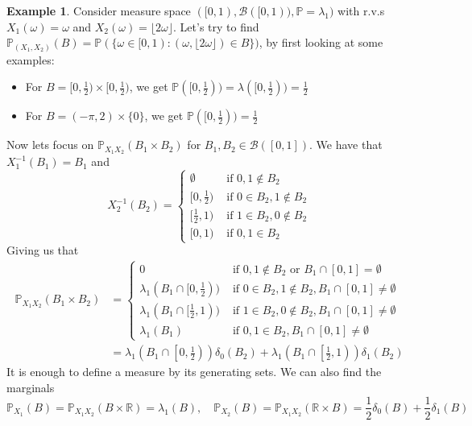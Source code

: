 \documentclass[11pt,a4paper]{article}
\theoremstyle{definition}
\newtheorem{example}{Example}[section]
\begin{document}
\begin{example}
    Consider measure space $([0,1), \mathcal{B}([0,1)), \mathbb{P} = \lambda_1)$ with r.v.s $X_1 (\omega ) = \omega$ and $X_2 (\omega) = \lfloor 2\omega \rfloor$. Let's try to find $\mathbb{P}_{(X_1, X_2)} (B) = \mathbb{P}(\{\omega \in [0,1):(\omega , \lfloor 2\omega \rfloor) \in B\})$, by first looking at some examples:
    \begin{itemize}
        \item For $B = [0,\frac{1}{2} ) \times [0,\frac{1}{2} )$, we get $\mathbb{P}([0,\frac{1}{2})) = \lambda ([0, \frac{1}{2})) = \frac{1}{2}$
        \item For $B = (-\pi , 2) \times \{0\}$, we get $\mathbb{P} ([0, \frac{1}{2})) = \frac{1}{2}$
    \end{itemize}
    Now lets focus on $\mathbb{P}_{X_1X_2}(B_1 \times B_2)$ for $B_1, B_2 \in \mathcal{B}([0,1])$. We have that $X_1^{-1}(B_1) = B_1$ and
    \[
    X_2^{-1}(B_2) = \begin{cases}
        \emptyset & \text{ if }0,1\notin B_2 \\ [0, \frac{1}{2}) & \text{ if }0 \in B_2, 1 \notin B_2\\ [\frac{1}{2}, 1) & \text{ if } 1 \in B_2, 0 \notin B_2 \\ [0,1) & \text{ if }0,1 \in B_2
    \end{cases}
    \]
    Giving us that \begin{align*}
    \mathbb{P}_{X_1X_2}(B_1 \times B_2) & = \begin{cases}
        0 & \text{ if }0,1\notin B_2 \text{ or } B_1 \cap [0,1] = \emptyset\\ \lambda_1(B_1 \cap [0, \frac{1}{2})) & \text{ if }0 \in B_2, 1\notin B_2, B_1 \cap [0,1] \ne \emptyset\\ \lambda _1(B_1 \cap [\frac{1}{2}, 1)) & \text{ if } 1 \in B_2, 0 \notin B_2, B_1 \cap [0,1] \ne \emptyset  \\ \lambda _1(B_1) & \text{ if }0,1 \in B_2, B_1 \cap [0,1] \ne \emptyset
    \end{cases} \\ & = \lambda _1\left(B_1 \cap \left[0, \frac{1}{2}\right)\right) \delta _0(B_2) + \lambda _1\left(B_1 \cap \left[\frac{1}{2}, 1\right)\right) \delta _1 (B_2)
    \end{align*}
    It is enough to define a measure by its generating sets. We can also find the marginals \[
    \mathbb{P}_{X_1} (B) = \mathbb{P}_{X_1X_2}(B \times \mathbb{R}) = \lambda _1 (B ), \quad \mathbb{P}_{X_2} (B) = \mathbb{P}_{X_1X_2}(\mathbb{R} \times B) = \frac{1}{2} \delta _0(B) + \frac{1}{2} \delta _1(B)
    \]
\end{example}
\end{document}
